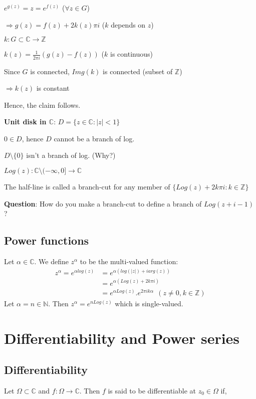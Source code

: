 \documentclass{article}
\begin{document}
\begin{flushleft}
$e^{g(z)}=z=e^{f(z)}$ ($\forall z\in G$)

$\Rightarrow g(z)=f(z)+ 2k(z)\pi i$ ($k$ depends on $z$)

$k: G\subset \mathds{C}\rightarrow \mathds{Z}$

$k(z)=\frac{1}{2\pi i}(g(z)-f(z))$ ($k$ is continuous)

Since $G$ is connected, $Img(k)$ is connected  (subset of $\mathds{Z}$)

$\Rightarrow k(z)$ is constant 

Hence, the claim follows.

\textbf{Unit disk in $\mathds{C}$}: $D=\{z\in \mathds{C}: |z|< 1\}$

$0\in D$, hence $D$ cannot be a branch of log. 

$D\setminus \{0\}$ isn't a branch of log. (Why?)

$Log(z): \mathds{C}\setminus (-\infty,0]\rightarrow \mathds{C}$

The half-line is called a branch-cut for any member of $\{Log(z)+2k\pi i: k\in \mathds{Z}\}$

\textbf{Question}: How do you make a branch-cut to define a branch of $Log(z+i-1)$?

\subsection{\textbf{Power functions}}

Let $\alpha \in \mathds{C}$. We define $z^{\alpha}$ to be the multi-valued function:
\begin{align} 
z^{\alpha}=e^{\alpha log(z)}&= e^{\alpha(log(|z|)+ iarg(z))}\nonumber\\
&= e^{\alpha(Log(z)+2k\pi i)}\nonumber\\
&=e^{\alpha Log(z)}.e^{2\pi ik\alpha} \:\:(z\neq 0\text{,} \:k\in \mathds{Z})\nonumber
\end{align}
Let $\alpha=n \in \mathds{N}$. Then $z^{\alpha}=e^{nLog(z)}$ which is single-valued.
\clearpage
\section{Differentiability and Power series}

\subsection{\textbf{Differentiability}} 

Let $\Omega \subset \mathds{C}$ and $f: \Omega \rightarrow \mathds{C}$. Then $f$ is said to be differentiable at $z_0\in \Omega$ if,


\end{flushleft}
\end{document}
